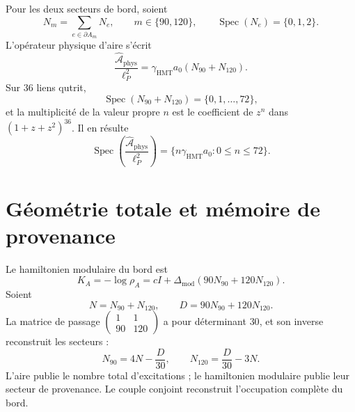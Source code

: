 Pour les deux secteurs de bord, soient
\begin{equation}
 N_m=\sum_{e\in\partial A_m}N_e,
 \qquad m\in\{90,120\},
 \qquad \operatorname{Spec}(N_e)=\{0,1,2\}.
 \label{eq:l9s102:n90-n120}
\end{equation}
L'opérateur physique d'aire s'écrit
\begin{equation}
 \boxed{
 \frac{\widehat{\mathcal A}_{\mathrm{phys}}}{\ell_P^2}
 =\gamma_{\mathrm{HMT}}a_0(N_{90}+N_{120}).}
 \label{eq:l9s102:area-operador}
\end{equation}
Sur \(36\) liens qutrit,
\begin{equation}
 \operatorname{Spec}(N_{90}+N_{120})=\{0,1,\ldots,72\},
 \label{eq:l9s102:area-numero-spectrum}
\end{equation}
et la multiplicité de la valeur propre \(n\) est le coefficient de \(z^n\) dans
\((1+z+z^2)^{36}\). Il en résulte
\begin{equation}
 \operatorname{Spec}\!\left(
 \frac{\widehat{\mathcal A}_{\mathrm{phys}}}{\ell_P^2}\right)
 =\{n\gamma_{\mathrm{HMT}}a_0:0\le n\le72\}.
 \label{eq:l9s102:area-spectrum}
\end{equation}

\section{Géométrie totale et mémoire de provenance}
\label{sec:l9s102:area-hamiltoniano}

Le hamiltonien modulaire du bord est
\begin{equation}
 \boxed{
 K_A=-\log\rho_A
 =cI+\Delta_{\mathrm{mod}}(90N_{90}+120N_{120}).}
 \label{eq:l9s102:hamiltoniano-modular}
\end{equation}
Soient
\begin{equation}
 N=N_{90}+N_{120},
 \qquad
 D=90N_{90}+120N_{120}.
 \label{eq:l9s102:n-d}
\end{equation}
La matrice de passage
\(\left(\begin{smallmatrix}1&1\\90&120\end{smallmatrix}\right)\)
a pour déterminant \(30\), et son inverse reconstruit les secteurs :
\begin{equation}
 \boxed{
 N_{90}=4N-\frac{D}{30},
 \qquad
 N_{120}=\frac{D}{30}-3N.}
 \label{eq:l9s102:reconstruccion-sectores}
\end{equation}
L'aire publie le nombre total d'excitations ; le hamiltonien modulaire
publie leur secteur de provenance. Le couple conjoint reconstruit l'occupation
complète du bord.

